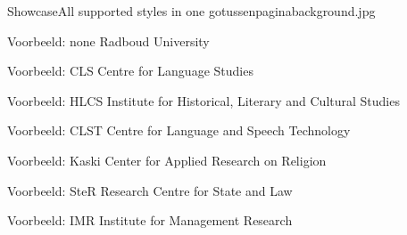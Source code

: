\documentclass[department=none, notes={show notes}, slidesperpage=4, official=true, handout]{beamerruhuisstijl}
\begin{document}

\begin{tussenpagina}{Showcase}{All supported styles in one go}{tussenpaginabackground.jpg}
\end{tussenpagina}
\note{}

\renewcommand{\dept}{none}
\begin{frame}
    \titlepage
\end{frame}
\begin{frame}{Voorbeeld: none}
	Radboud University
\end{frame}

\renewcommand{\dept}{cls}
\begin{frame}
    \titlepage
\end{frame}
\begin{frame}{Voorbeeld: CLS}
	Centre for Language Studies
\end{frame}

\renewcommand{\dept}{hlcs}
\begin{frame}
    \titlepage
\end{frame}
\begin{frame}{Voorbeeld: HLCS}
	Institute for Historical, Literary and Cultural Studies
\end{frame}

\renewcommand{\dept}{clst}
\begin{frame}
    \titlepage
\end{frame}
\begin{frame}{Voorbeeld: CLST}
	Centre for Language and Speech Technology
\end{frame}

\renewcommand{\dept}{kaski}
\begin{frame}
    \titlepage
\end{frame}
\begin{frame}{Voorbeeld: Kaski}
	Center for Applied Research on Religion
\end{frame}

\renewcommand{\dept}{ster}
\begin{frame}
    \titlepage
\end{frame}
\begin{frame}{Voorbeeld: SteR}
	Research Centre for State and Law
\end{frame}

\renewcommand{\dept}{imr}
\begin{frame}
    \titlepage
\end{frame}
\begin{frame}{Voorbeeld: IMR}
	Institute for Management Research
\end{frame}
\end{document}
